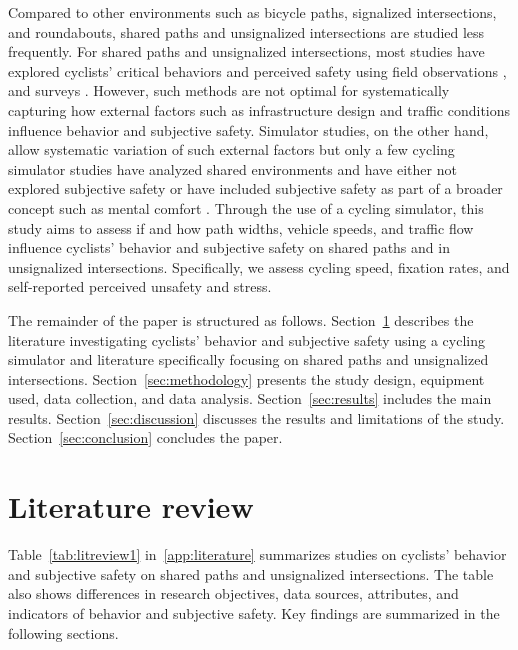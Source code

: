 \documentclass[3p,authoryear]{elsarticle}
\begin{document}
Compared to other environments such as bicycle paths, signalized intersections,
and roundabouts, shared paths and unsignalized intersections are studied less
frequently. For shared paths and unsignalized intersections, most studies have
explored cyclists' critical behaviors and perceived safety using field
observations \citep{che2021interaction,huang2021investigating,beitel2018assessing,%
boufous2018impact,essa2018road,mohammadi2023how}, and surveys
\citep{vonstulpnagel2024matter,che2021interaction,gkekas2020perceived,%
beitel2018assessing,ng2017cyclist}. However, such methods are not optimal for
systematically capturing how external factors such as infrastructure design and
traffic conditions influence behavior and subjective safety. Simulator studies,
on the other hand, allow systematic variation of such external factors but only
a few cycling simulator studies have analyzed shared environments and have
either not explored subjective safety
\citep{mohammadi2024understanding,zeuwts2023using,suzuki2018fundamental} or have
included subjective safety as part of a broader concept such as mental comfort
\citep{berghoefer2023prefer}. Through the use of a cycling simulator, this study
aims to assess if and how path widths, vehicle speeds, and traffic flow
influence cyclists' behavior and subjective safety on shared paths and in
unsignalized intersections. Specifically, we assess cycling speed, fixation
rates, and self-reported perceived unsafety and stress.

The remainder of the paper is structured as follows.
Section~\ref{sec:literature} describes the literature investigating cyclists'
behavior and subjective safety using a cycling simulator and literature
specifically focusing on shared paths and unsignalized intersections.
Section~\ref{sec:methodology} presents the study design, equipment used, data
collection, and data analysis. Section~\ref{sec:results} includes the main
results. Section~\ref{sec:discussion} discusses the results and limitations of
the study. Section~\ref{sec:conclusion} concludes the paper.

\section{Literature review}\label{sec:literature}
Table~\ref{tab:litreview1} in~\ref{app:literature} summarizes studies
on cyclists' behavior and subjective safety on shared paths and unsignalized
intersections. The table also shows differences in research objectives, data
sources, attributes, and indicators of behavior and subjective safety. Key
findings are summarized in the following sections.
\end{document}
